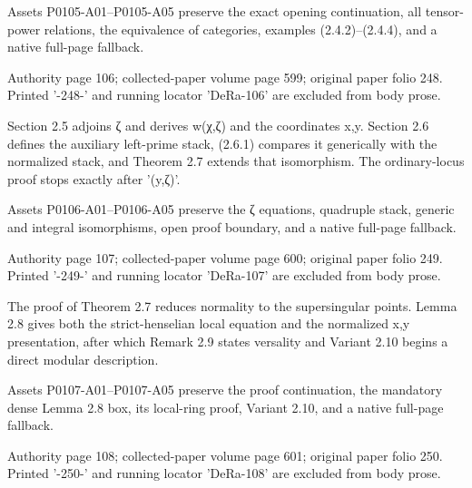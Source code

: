 \documentclass[11pt,a4paper]{article}
\begin{document}
Assets P0105-A01--P0105-A05 preserve the exact opening continuation, all tensor-power relations, the equivalence of categories, examples (2.4.2)--(2.4.4), and a native full-page fallback.


\par\medskip
\hypertarget{D018-P0106}{}
\par\smallskip
Authority page 106; collected-paper volume page 599; original paper folio 248. Printed '-248-' and running locator 'DeRa-106' are excluded from body prose.

Section 2.5 adjoins ζ and derives w(χ,ζ) and the coordinates x,y. Section 2.6 defines the auxiliary left-prime stack, (2.6.1) compares it generically with the normalized stack, and Theorem 2.7 extends that isomorphism. The ordinary-locus proof stops exactly after '(y,ζ)'.

Assets P0106-A01--P0106-A05 preserve the ζ equations, quadruple stack, generic and integral isomorphisms, open proof boundary, and a native full-page fallback.


\par\medskip
\hypertarget{D018-P0107}{}
\par\smallskip
Authority page 107; collected-paper volume page 600; original paper folio 249. Printed '-249-' and running locator 'DeRa-107' are excluded from body prose.

The proof of Theorem 2.7 reduces normality to the supersingular points. Lemma 2.8 gives both the strict-henselian local equation and the normalized x,y presentation, after which Remark 2.9 states versality and Variant 2.10 begins a direct modular description.

Assets P0107-A01--P0107-A05 preserve the proof continuation, the mandatory dense Lemma 2.8 box, its local-ring proof, Variant 2.10, and a native full-page fallback.


\par\medskip
\hypertarget{D018-P0108}{}
\par\smallskip
Authority page 108; collected-paper volume page 601; original paper folio 250. Printed '-250-' and running locator 'DeRa-108' are excluded from body prose.
\end{document}

